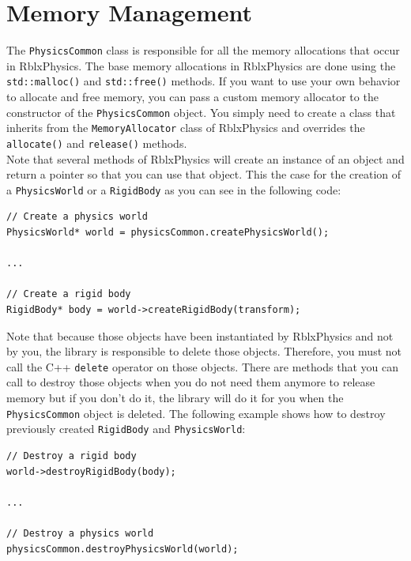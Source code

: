 \documentclass[a4paper,12pt]{article}
\begin{document}
   \section{Memory Management}

   The \texttt{PhysicsCommon} class is responsible for all the memory allocations that occur in RblxPhysics. The base memory allocations in RblxPhysics
   are done using the \texttt{std::malloc()} and \texttt{std::free()} methods. If you want to use your own behavior to allocate and free memory, you can pass
   a custom memory allocator to the constructor of the \texttt{PhysicsCommon} object. You simply need to create a class that inherits from the
   \texttt{MemoryAllocator} class of RblxPhysics and overrides the \texttt{allocate()} and \texttt{release()} methods. \\

   Note that several methods of RblxPhysics will create an instance of an object and return a pointer so that you can use that object. This the case
   for the creation of a \texttt{PhysicsWorld} or a \texttt{RigidBody} as you can see in the following code: \\

   \begin{lstlisting}
// Create a physics world
PhysicsWorld* world = physicsCommon.createPhysicsWorld();

...

// Create a rigid body
RigidBody* body = world->createRigidBody(transform);
   \end{lstlisting}

   \vspace{0.6cm}

   Note that because those objects have been instantiated by RblxPhysics and not by you, the library is responsible to delete those objects. Therefore,
   you must not call the C++ \texttt{delete} operator on those objects. There are methods that you can call to destroy those objects when you do not need
   them anymore to release memory but if you don't do it, the library will do it for you when the \texttt{PhysicsCommon} object is deleted. The
   following example shows how to destroy previously created \texttt{RigidBody} and \texttt{PhysicsWorld}: \\

   \begin{lstlisting}
// Destroy a rigid body
world->destroyRigidBody(body);

...

// Destroy a physics world
physicsCommon.destroyPhysicsWorld(world);
   \end{lstlisting}
\end{document}
